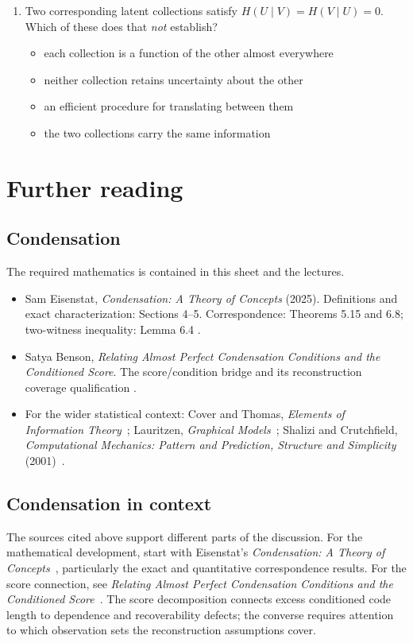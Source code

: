 \documentclass[11pt]{article}
\begin{document}
\begin{enumerate}
\item Two corresponding latent collections satisfy $H(U\mid V)=H(V\mid U)=0$.
Which of these does that \emph{not} establish?
\begin{itemize}
\item each collection is a function of the other almost everywhere
\item neither collection retains uncertainty about the other
\item an efficient procedure for translating between them
\item the two collections carry the same information
\end{itemize}
\end{enumerate}

\section{Further reading}
\label{sec:further-reading}
\subsection{Condensation}
\label{sec:reading}
The required mathematics is contained in this sheet and the lectures.
\begin{itemize}
\item Sam Eisenstat, \emph{Condensation: A Theory of Concepts} (2025).
Definitions and exact characterization: Sections 4--5. Correspondence:
Theorems 5.15 and 6.8; two-witness inequality: Lemma 6.4
\citep{eisenstat2025condensation}.
\item Satya Benson, \emph{Relating Almost Perfect Condensation Conditions and
the Conditioned Score}. The score/condition bridge and its reconstruction
coverage qualification
\citep{benson2026relating}.
\item For the wider statistical context: Cover and Thomas,
\emph{Elements of Information Theory}~\citep{cover2006elements}; Lauritzen, \emph{Graphical Models}~\citep{lauritzen1996graphical};
Shalizi and Crutchfield, \emph{Computational Mechanics: Pattern and Prediction,
Structure and Simplicity} (2001)~\citep{shalizi2001computational}.
\end{itemize}

\subsection{Condensation in context}
The sources cited above support different parts
of the discussion. For the mathematical development, start with
Eisenstat's \emph{Condensation: A Theory of Concepts}~\citep{eisenstat2025condensation},
particularly the exact and quantitative correspondence results.
For the score connection, see
\emph{Relating Almost Perfect Condensation Conditions and the Conditioned Score}~\citep{benson2026relating}.
The score decomposition connects excess conditioned code length to dependence
and recoverability defects; the converse requires attention to which observation
sets the reconstruction assumptions cover.



\end{document}
